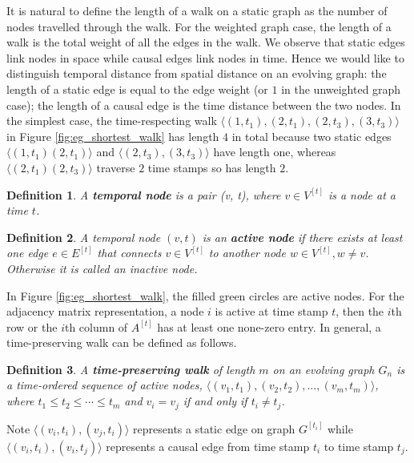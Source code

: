\documentclass[12pt]{article}
\newtheorem{definition}{Definition}
\theoremstyle{definition}
\begin{document}
It is natural to define the length of a walk on a static graph as the number of nodes travelled through the walk. For the weighted graph case, the length of a walk is the total weight of all the edges in the walk. We observe that static edges link nodes in space while causal edges link nodes in time. Hence we would like to distinguish temporal distance from spatial distance on an evolving graph: the length of a static edge is equal to the edge weight (or $1$ in the unweighted graph case); the length of a causal edge is the time distance between the two nodes. In the simplest case, the time-respecting walk
$\langle (1, t_1) ,(2, t_1) , (2, t_3), (3, t_3)\rangle$ in Figure \ref{fig:eg_shortest_walk} has length $4$ in total because two static edges $\langle (1, t_1) (2, t_1) \rangle$ and $\langle (2, t_3), (3, t_3) \rangle$ have length one, whereas $\langle (2, t_1) (2, t_3) \rangle$ traverse $2$ time stamps so has length $2$.


\begin{definition}
  A \textbf{temporal node} is a pair (v, t), where $v \in V^{[t]}$ is a node at a time $t$.
\end{definition}


\begin{definition}
  A temporal node $(v, t)$ is an \textbf{active node} if there exists at least one edge $e \in E^{[t]}$ that connects $v \in V^{[t]}$ to another node $w \in V^{[t]}, w\ne v$. Otherwise it is called an inactive node.
\end{definition}

In Figure \ref{fig:eg_shortest_walk}, the filled green circles are active nodes. For the adjacency matrix representation, a node $i$ is active at time stamp $t$, then
the $i$th row or the $i$th column of $A^{[t]}$ has at least one none-zero entry.
 In general, a time-preserving walk can be defined as follows.

\begin{definition}
A \textbf{time-preserving walk}  of length $m$ on an evolving graph $G_n$ is a time-ordered sequence of active nodes, $\langle (v_1, t_1), (v_2, t_2), \ldots, (v_m, t_m) \rangle$, where $t_1 \le t_2 \le \cdots \le t_m$ and
$v_i = v_j$ if and only if $t_i \ne t_j$.
\end{definition}

Note $\langle (v_i, t_i), (v_j, t_i) \rangle$ represents a static edge on graph $G^{[t_i]}$ while $\langle (v_i, t_i), (v_i, t_j) \rangle$ represents a causal edge from time stamp $t_i$ to time stamp $t_j$.
\end{document}
